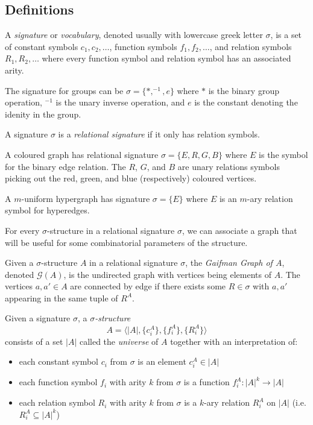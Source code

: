 \subsection{Definitions}
\begin{defn}
A \textit{signature} or \textit{vocabulary}, denoted usually with lowercase greek letter $\sigma$, is a set of constant symbols $c_{1},c_{2},\dots$, function symbols $f_{1},f_{2},\dots$, and relation symbols $R_{1},R_{2},\dots$ where every function symbol and relation symbol has an associated arity. 
\end{defn}
\begin{exmpl}
The signature for groups can be $\sigma = \{*,^{-1},e\}$ where $*$ is the binary group operation, $^{-1}$ is the unary inverse operation, and $e$ is the constant denoting the idenity in the group. 
\end{exmpl}
\begin{defn}
A signature $\sigma$ is a \textit{relational signature} if it only has relation symbols.
\end{defn}
\begin{exmpl}
A coloured graph has relational signature $\sigma = \{E,R,G,B\}$ where $E$ is the symbol for the binary edge relation. The $R$, $G$, and $B$ are unary relations symbols picking out the red, green, and blue (respectively) coloured vertices. 
\end{exmpl}
\begin{exmpl}
A $m$-uniform hypergraph has signature $\sigma = \{E\}$ where $E$ is an $m$-ary relation symbol for hyperedges.
\end{exmpl}
For every $\sigma$-structure in a relational signature $\sigma$, we can associate a graph that will be useful for some combinatorial parameters of the structure.
\begin{defn}
Given a $\sigma$-structure $A$ in a relational signature $\sigma$, the \textit{Gaifman Graph of $A$}, denoted $\mathcal{G}(A)$, is the undirected graph with vertices being elements of $A$. The vertices $a,a' \in A$ are connected by edge if there exists some $R \in \sigma$ with $a,a'$ appearing in the same tuple of $R^{A}$. 
\label{defn:gaifmanGraph}
\end{defn}
\begin{defn}
Given a signature $\sigma$, a \textit{$\sigma$-structure} 
$$A = \langle |A|, \{c_{i}^{A}\}, \{f_{i}^{A}\}, \{R_{i}^{A}\} \rangle$$ 
consists of a set $|A|$ called the \textit{universe} of $A$ together with an interpretation of:
\begin{itemize}
    \item each constant symbol $c_{i}$ from $\sigma$ is an element $c_{i}^{A} \in |A|$ 
    \item each function symbol $f_{i}$ with arity $k$ from $\sigma$ is a function $f_{i}^{A}:|A|^{k} \longrightarrow |A|$
    \item each relation symbol $R_{i}$ with arity $k$ from $\sigma$ is a $k$-ary relation $R_{i}^{A}$ on $|A|$ (i.e. $R_{i}^{A} \subseteq |A|^{k}$) 
\end{itemize}
\label{defn:structure}
\end{defn}
